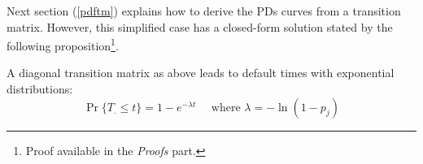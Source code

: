 \documentclass[11pt,fleqn]{book} %
\begin{document}
Next section (\ref{pdftm}) explains how to derive the PDs curves from a 
transition matrix. However, this simplified case has a closed-form solution 
stated by the following proposition\footnote{Proof available in the 
\emph{Proofs} part.}.

\begin{proposition}
	\label{prop:pdfsv}
	A diagonal transition matrix as above leads to default times with 
	exponential distributions:
	\begin{displaymath}
		\Pr\{T_. \le t\} = 1 - e^{-\lambda t} 
		\quad \text{ where } \lambda = -\ln(1-p_j)
	\end{displaymath}
\end{proposition}

\end{document}
